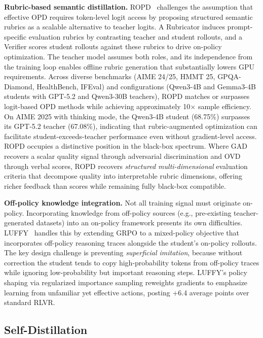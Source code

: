 \documentclass{article} %
\begin{document}
\textbf{Rubric-based semantic distillation.} ROPD~\citep{fang2026ropd} challenges the assumption that effective OPD requires token-level logit access by proposing structured semantic rubrics as a scalable alternative to teacher logits. A Rubricator induces prompt-specific evaluation rubrics by contrasting teacher and student rollouts, and a Verifier scores student rollouts against these rubrics to drive on-policy optimization. The teacher model assumes both roles, and its independence from the training loop enables offline rubric generation that substantially lowers GPU requirements. Across diverse benchmarks (AIME 24/25, HMMT 25, GPQA-Diamond, HealthBench, IFEval) and configurations (Qwen3-4B and Gemma3-4B students with GPT-5.2 and Qwen3-30B teachers), ROPD matches or surpasses logit-based OPD methods while achieving approximately 10$\times$ sample efficiency. On AIME 2025 with thinking mode, the Qwen3-4B student (68.75\%) surpasses its GPT-5.2 teacher (67.08\%), indicating that rubric-augmented optimization can facilitate student-exceeds-teacher performance even without gradient-level access. ROPD occupies a distinctive position in the black-box spectrum. Where GAD recovers a scalar quality signal through adversarial discrimination and OVD through verbal scores, ROPD recovers \emph{structured multi-dimensional} evaluation criteria that decompose quality into interpretable rubric dimensions, offering richer feedback than scores while remaining fully black-box compatible.

\textbf{Off-policy knowledge integration.} Not all training signal must originate on-policy. Incorporating knowledge from off-policy sources (e.g., pre-existing teacher-generated datasets) into an on-policy framework presents its own difficulties. LUFFY~\citep{2504.14945} handles this by extending GRPO to a mixed-policy objective that incorporates off-policy reasoning traces alongside the student's on-policy rollouts. The key design challenge is preventing \emph{superficial imitation}, because without correction the student tends to copy high-probability tokens from off-policy traces while ignoring low-probability but important reasoning steps. LUFFY's policy shaping via regularized importance sampling reweights gradients to emphasize learning from unfamiliar yet effective actions, posting +6.4 average points over standard RLVR.

\subsection{Self-Distillation}
\label{subsec:self_distill}
\end{document}
